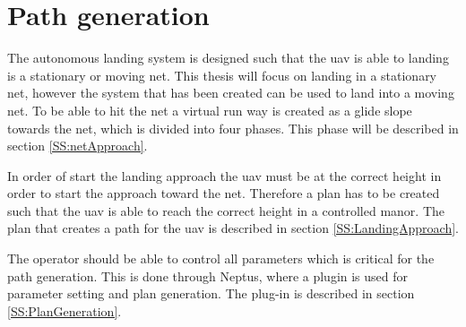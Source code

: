 \section{Path generation}
The autonomous landing system is designed such that the \gls{uav} is able to landing is a stationary or moving net. This thesis will focus on landing in a stationary net, however the system that has been created can be used to land into a moving net. To be able to hit the net a virtual run way is created as a glide slope towards the net, which is divided into four phases. This phase will be described in section \ref{SS:netApproach}.

In order of start the landing approach the \gls{uav} must be at the correct height in order to start the approach toward the net. Therefore a plan has to be created such that the \gls{uav} is able to reach the correct height in a controlled manor. The plan that creates a path for the \gls{uav} is described in section \ref{SS:LandingApproach}.

The operator should be able to control all parameters which is critical for the path generation. This is done through Neptus, where a plugin is used for parameter setting and plan generation. The plug-in is described in section \ref{SS:PlanGeneration}.


